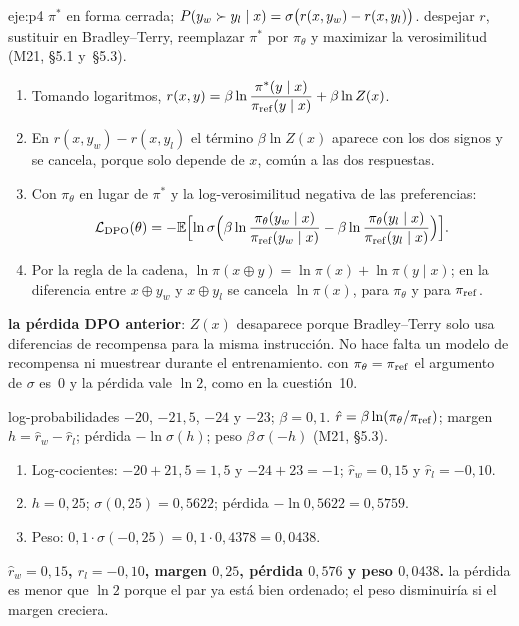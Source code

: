 \begin{solucion}{eje:p4}
\datos $\pi^{*}$ en forma cerrada; $P(y_w\succ y_l\mid x)=\sigma\bigl(r(x,y_w)-r(x,y_l)\bigr)$.
\planteamiento despejar $r$, sustituir en Bradley--Terry, reemplazar $\pi^{*}$ por $\pi_\theta$ y maximizar la verosimilitud (M21, §5.1 y~§5.3).
\pasos
\begin{enumerate}[label=\arabic*.]
  \item Tomando logaritmos, $r(x,y)=\beta\ln\dfrac{\pi^{*}(y\mid x)}{\pi_{\mathrm{ref}}(y\mid x)}+\beta\ln Z(x)$.
  \item En $r(x,y_w)-r(x,y_l)$ el término $\beta\ln Z(x)$ aparece con los dos signos y se cancela, porque solo depende de $x$, común a las dos respuestas.
  \item Con $\pi_\theta$ en lugar de $\pi^{*}$ y la log-verosimilitud negativa de las preferencias:
  \[
  \mathcal{L}_{\mathrm{DPO}}(\theta)=-\mathbb{E}\Bigl[\ln\sigma\Bigl(\beta\ln\frac{\pi_\theta(y_w\mid x)}{\pi_{\mathrm{ref}}(y_w\mid x)}-\beta\ln\frac{\pi_\theta(y_l\mid x)}{\pi_{\mathrm{ref}}(y_l\mid x)}\Bigr)\Bigr].
  \]
  \item Por la regla de la cadena, $\ln\pi(x\oplus y)=\ln\pi(x)+\ln\pi(y\mid x)$; en la diferencia entre $x\oplus y_w$ y $x\oplus y_l$ se cancela $\ln\pi(x)$, para $\pi_\theta$ y para $\pi_{\mathrm{ref}}$.
\end{enumerate}
\resultado \textbf{la pérdida DPO anterior}: $Z(x)$ desaparece porque Bradley--Terry solo usa diferencias de recompensa para la misma instrucción. No hace falta un modelo de recompensa ni muestrear durante el entrenamiento.
\comprobacion con $\pi_\theta=\pi_{\mathrm{ref}}$ el argumento de $\sigma$ es~0 y la pérdida vale $\ln 2$, como en la cuestión~10.

\datos log-probabilidades $-20$, $-21{,}5$, $-24$ y $-23$; $\beta=0{,}1$.
\planteamiento $\hat r=\beta\ln(\pi_\theta/\pi_{\mathrm{ref}})$; margen $h=\hat r_w-\hat r_l$; pérdida $-\ln\sigma(h)$; peso $\beta\,\sigma(-h)$ (M21, §5.3).
\pasos
\begin{enumerate}[label=\arabic*.]
  \item Log-cocientes: $-20+21{,}5=1{,}5$ y $-24+23=-1$; $\hat r_w=0{,}15$ y $\hat r_l=-0{,}10$.
  \item $h=0{,}25$; $\sigma(0{,}25)=0{,}5622$; pérdida $-\ln 0{,}5622=0{,}5759$.
  \item Peso: $0{,}1\cdot\sigma(-0{,}25)=0{,}1\cdot 0{,}4378=0{,}0438$.
\end{enumerate}
\resultado \textbf{$\hat r_w=0{,}15$, $\hat r_l=-0{,}10$, margen $0{,}25$, pérdida $0{,}576$ y peso $0{,}0438$.}
\comprobacion la pérdida es menor que $\ln 2$ porque el par ya está bien ordenado; el peso disminuiría si el margen creciera.


\end{solucion}

